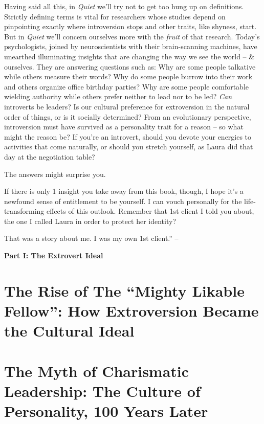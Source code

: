 \documentclass{article}
\numberwithin{equation}{section}
\begin{document}
Having said all this, in \textit{Quiet} we'll try not to get too hung up on definitions. Strictly defining terms is vital for researchers whose studies depend on pinpointing exactly where introversion stops and other traits, like shyness, start. But in \textit{Quiet} we'll concern ourselves more with the \textit{fruit} of that research. Today's psychologists, joined by neuroscientists with their brain-scanning machines, have unearthed illuminating insights that are changing the way we see the world -- \& ourselves. They are answering questions such as: Why are some people talkative while others measure their words? Why do some people burrow into their work and others organize office birthday parties? Why are some people comfortable wielding authority while others prefer neither to lead nor to be led? \textit{Can} introverts be leaders? Is our cultural preference for extroversion in the natural order of things, or is it socially determined? From an evolutionary perspective, introversion must have survived as a personality trait for a reason -- so what might the reason be? If you're an introvert, should you devote your energies to activities that come naturally, or should you stretch yourself, as Laura did that day at the negotiation table?

The answers might surprise you.

If there is only 1 insight you take away from this book, though, I hope it's a newfound sense of entitlement to be yourself. I can vouch personally for the life-transforming effects of this outlook. Remember that 1st client I told you about, the one I called Laura in order to protect her identity?

That was a story about me. I was my own 1st client.'' -- \cite[pp. 13--]{Cain2013}


\begin{center}\LARGE\sf
	\textbf{Part I: The Extrovert Ideal}
\end{center}

\section{The Rise of The ``Mighty Likable Fellow'': How Extroversion Became the Cultural Ideal}


\section{The Myth of Charismatic Leadership: The Culture of Personality, 100 Years Later}
\end{document}
